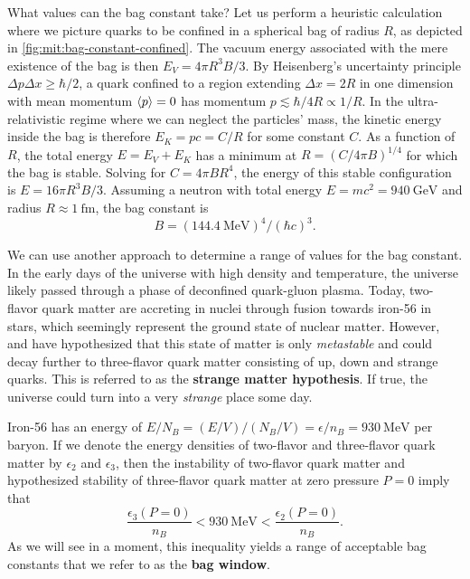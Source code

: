 What values can the bag constant take?
Let us perform a heuristic calculation where we picture quarks to be confined in a spherical bag of radius $R$, as depicted in \cref{fig:mit:bag-constant-confined}.
The vacuum energy associated with the mere existence of the bag is then $E_V = 4 \pi R^3 B / 3$.
By Heisenberg's uncertainty principle $\Delta p \Delta x \geq \hbar/2$, a quark confined to a region extending $\Delta x = 2R$ in one dimension with mean momentum $\langle p \rangle = 0$ has momentum $p \lesssim \hbar/4R \propto 1/R$.
In the ultra-relativistic regime where we can neglect the particles' mass, the kinetic energy inside the bag is therefore $E_K = pc = C / R$ for some constant $C$.
As a function of $R$, the total energy $E = E_V + E_K$ has a minimum at $R = (C/4 \pi B)^{1/4}$ for which the bag is stable.
Solving for $C = 4 \pi B R^4$, the energy of this stable configuration is $E = 16 \pi R^3 B / 3$.
Assuming a neutron with total energy $E = m c^2 = \SI{940}{\giga\electronvolt}$ and radius $R \approx \SI{1}{\femto\meter}$,
the bag constant is
\begin{equation}
	B = (\SI{144.4}{\mega\electronvolt})^4 / (\hbar c)^3.
\label{eq:mit:bag_constant_optimal}
\end{equation}

We can use another approach to determine a range of values for the bag constant.
In the early days of the universe with high density and temperature, the universe likely passed through a phase of deconfined quark-gluon plasma.
Today, two-flavor quark matter are accreting in nuclei through fusion towards iron-56 in stars, which seemingly represent the ground state of nuclear matter.
However, \cite{ref:strange_hypothesis_bodmer} and \cite{ref:strange_hypothesis_witten} have hypothesized that this state of matter is only \emph{metastable}
and could decay further to three-flavor quark matter consisting of up, down and strange quarks.
This is referred to as the \textbf{strange matter hypothesis}.
If true, the universe could turn into a very \emph{strange} place some day.

Iron-56 has an energy of $E/N_B = (E/V) / (N_B/V) = \epsilon/n_B = \SI{930}{\mega\electronvolt}$ per baryon.
If we denote the energy densities of two-flavor and three-flavor quark matter by $\epsilon_2$ and $\epsilon_3$,
then the instability of two-flavor quark matter and hypothesized stability of three-flavor quark matter at zero pressure $P=0$ imply that
\begin{equation}
	\frac{\epsilon_3(P=0)}{n_B} < \SI{930}{\mega\electronvolt} < \frac{\epsilon_2(P=0)}{n_B} .
\label{eq:mit:bag_stability}
\end{equation}
As we will see in a moment, this inequality yields a range of acceptable bag constants that we refer to as the \textbf{bag window}.

